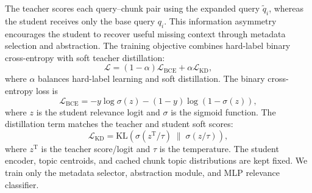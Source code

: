 The teacher scores each query--chunk pair using the expanded query $\tilde{q}_i$, whereas the student receives only the base query $q_i$. This information asymmetry encourages the student to recover useful missing context through metadata selection and abstraction. The training objective combines hard-label binary cross-entropy with soft teacher distillation:
\begin{equation}
    \mathcal{L}
    =
    (1-\alpha)\mathcal{L}_{\mathrm{BCE}}
    +
    \alpha \mathcal{L}_{\mathrm{KD}},
\end{equation}
where $\alpha$ balances hard-label learning and soft distillation. The binary cross-entropy loss is
\begin{equation}
    \mathcal{L}_{\mathrm{BCE}}
    =
    - y \log \sigma(z)
    - (1-y)\log(1-\sigma(z)),
\end{equation}
where $z$ is the student relevance logit and $\sigma$ is the sigmoid function. The distillation term matches the teacher and student soft scores:
\begin{equation}
    \mathcal{L}_{\mathrm{KD}}
    =
    \mathrm{KL}
    \left(
    \sigma(z^{\mathrm{T}}/\tau)
    \;\|\;
    \sigma(z/\tau)
    \right),
\end{equation}
where $z^{\mathrm{T}}$ is the teacher score/logit and $\tau$ is the temperature. The student encoder, topic centroids, and cached chunk topic distributions are kept fixed. We train only the metadata selector, abstraction module, and MLP relevance classifier.

